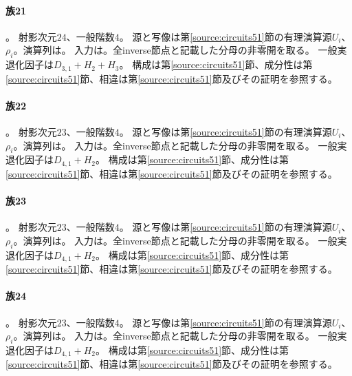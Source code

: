 \paragraph{族21}\label{catalogue:T21}
。
射影次元$24$、一般階数$4$。
源と写像は第\ref{source:circuits51}節の有理演算源$U_i$、$\rho_i$。演算列は。
入力は。全inverse節点と記載した分母の非零開を取る。
一般実退化因子は$D_{3,1}+H_{2}+H_{3}$。
構成は第\ref{source:circuits51}節、成分性は第\ref{source:circuits51}節、相違は第\ref{source:circuits51}節及びその証明を参照する。

\paragraph{族22}\label{catalogue:T22}
。
射影次元$23$、一般階数$4$。
源と写像は第\ref{source:circuits51}節の有理演算源$U_i$、$\rho_i$。演算列は。
入力は。全inverse節点と記載した分母の非零開を取る。
一般実退化因子は$D_{4,1}+H_{2}$。
構成は第\ref{source:circuits51}節、成分性は第\ref{source:circuits51}節、相違は第\ref{source:circuits51}節及びその証明を参照する。

\paragraph{族23}\label{catalogue:T23}
。
射影次元$23$、一般階数$4$。
源と写像は第\ref{source:circuits51}節の有理演算源$U_i$、$\rho_i$。演算列は。
入力は。全inverse節点と記載した分母の非零開を取る。
一般実退化因子は$D_{4,1}+H_{2}$。
構成は第\ref{source:circuits51}節、成分性は第\ref{source:circuits51}節、相違は第\ref{source:circuits51}節及びその証明を参照する。

\paragraph{族24}\label{catalogue:T24}
。
射影次元$23$、一般階数$4$。
源と写像は第\ref{source:circuits51}節の有理演算源$U_i$、$\rho_i$。演算列は。
入力は。全inverse節点と記載した分母の非零開を取る。
一般実退化因子は$D_{4,1}+H_{2}$。
構成は第\ref{source:circuits51}節、成分性は第\ref{source:circuits51}節、相違は第\ref{source:circuits51}節及びその証明を参照する。

